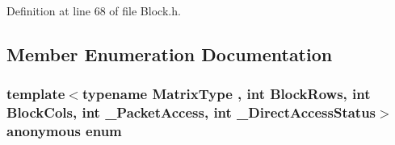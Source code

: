 Definition at line 68 of file Block.\-h.



\subsection{Member Enumeration Documentation}
\hypertarget{structei__traits_3_01_block_3_01_matrix_type_00_01_block_rows_00_01_block_cols_00_01___packet_ac479d6b4c208794fdc7c9c0ab098ad674_a117d621d1b101f12b31944c2303ecc30}{\subsubsection[{anonymous enum}]{\setlength{\rightskip}{0pt plus 5cm}template$<$typename Matrix\-Type , int Block\-Rows, int Block\-Cols, int \-\_\-\-Packet\-Access, int \-\_\-\-Direct\-Access\-Status$>$ anonymous enum}}\label{structei__traits_3_01_block_3_01_matrix_type_00_01_block_rows_00_01_block_cols_00_01___packet_ac479d6b4c208794fdc7c9c0ab098ad674_a117d621d1b101f12b31944c2303ecc30}
